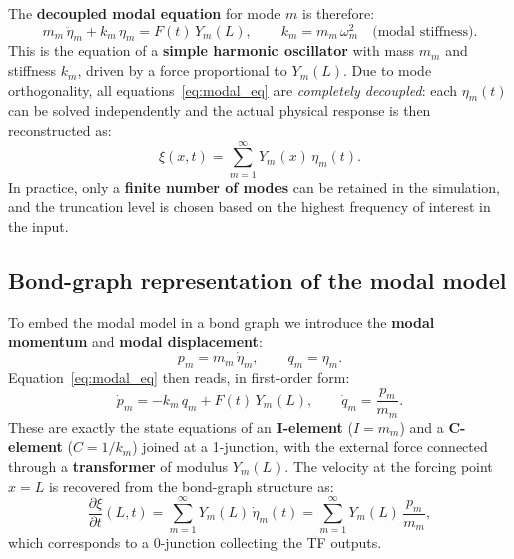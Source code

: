 The \textbf{decoupled modal equation} for mode $m$ is therefore:
\begin{equation}
  \boxed{
    m_{m}\,\ddot{\eta}_{m} + k_{m}\,\eta_{m} = F(t)\,Y_{m}(L)
  },
  \qquad
  k_{m} = m_{m}\,\omega_{m}^{2}
  \quad\text{(modal stiffness)}.
  \label{eq:modal_eq}
\end{equation}
This is the equation of a \textbf{simple harmonic oscillator} with mass $m_{m}$
and stiffness $k_{m}$, driven by a force proportional to $Y_{m}(L)$.  Due to
mode orthogonality, all equations~\eqref{eq:modal_eq} are \emph{completely
decoupled}: each $\eta_{m}(t)$ can be solved independently and the actual
physical response is then reconstructed as:
\begin{equation}
  \xi(x,t) = \sum_{m=1}^{\infty} Y_{m}(x)\,\eta_{m}(t).
\end{equation}
In practice, only a \textbf{finite number of modes} can be retained in the
simulation, and the truncation level is chosen based on the highest frequency of
interest in the input.


\subsection{Bond-graph representation of the modal model}
\label{ssec:modal_bg}

To embed the modal model in a bond graph we introduce the \textbf{modal momentum}
and \textbf{modal displacement}:
\begin{equation}
  p_{m} = m_{m}\,\dot{\eta}_{m},
  \qquad
  q_{m} = \eta_{m}.
  \label{eq:modal_state_vars}
\end{equation}
Equation~\eqref{eq:modal_eq} then reads, in first-order form:
\begin{equation}
  \dot{p}_{m} = -k_{m}\,q_{m} + F(t)\,Y_{m}(L),
  \qquad
  \dot{q}_{m} = \frac{p_{m}}{m_{m}}.
  \label{eq:modal_state_eqs}
\end{equation}
These are exactly the state equations of an \textbf{I-element} ($I = m_{m}$) and
a \textbf{C-element} ($C = 1/k_{m}$) joined at a 1-junction, with the external
force connected through a \textbf{transformer} of modulus $Y_{m}(L)$.  The
velocity at the forcing point $x = L$ is recovered from the bond-graph structure
as:
\begin{equation}
  \frac{\partial\xi}{\partial t}(L,t)
  = \sum_{m=1}^{\infty} Y_{m}(L)\,\dot{\eta}_{m}(t)
  = \sum_{m=1}^{\infty} Y_{m}(L)\,\frac{p_{m}}{m_{m}},
\end{equation}
which corresponds to a 0-junction collecting the TF outputs.


